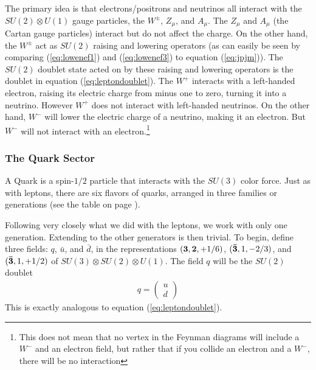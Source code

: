 \documentclass[12pt,epsf]{article}
\begin{document}
The primary idea is that electrons/positrons and neutrinos all interact
with the $SU(2)\otimes U(1)$ gauge particles, the $W^{\pm}$, $Z_{\mu}$,
and $A_{\mu}$.	The $Z_{\mu}$ and $A_{\mu}$ (the Cartan gauge
particles) interact but do not affect the charge.  On the other hand,
the $W^{\pm}$ act as $SU(2)$ raising and lowering operators (as can
easily be seen by comparing (\ref{eq:lowenef1}) and (\ref{eq:lowenef3})
to equation (\ref{eq:jpjm})).  The $SU(2)$ doublet state acted on by these raising
and lowering operators is the doublet in equation
(\ref{eq:leptondoublet}).  The $W^+$ interacts with a left-handed electron,
raising its electric charge from minus one to zero, turning it into a
neutrino.  However $W^+$ does not interact with left-handed neutrinos. 
On the other hand, $W^-$ will lower the electric charge of a neutrino,
making it an electron.	But $W^-$ will not interact with an electron.\footnote{This
does not mean that no vertex in the Feynman diagrams will include a $W^-$ and an 
electron field, but rather that if you collide an electron and a $W^-$, there will be no
interaction}

\subsubsection{The Quark Sector}

A Quark is a spin-$1/2$ particle that interacts with the $SU(3)$ color
force.	Just as with leptons, there are six flavors of quarks, arranged
in three families or generations (see the table on page
\pageref{standardmodelsummary}).  

Following very closely what we did with the leptons, we work with only
one generation.  Extending to the other generators is then trivial.  To
begin, define three fields: $q$, $\bar u$, and $\bar d$, in the
representations $(\bf 3\rm, \bf 2\rm, +1/6)$, $(\bf \bar 3\rm,1,-2/3)$,
and $(\bf \bar 3\rm, 1,+1/2)$ of $SU(3)\otimes SU(2)\otimes U(1)$.  The
field $q$ will be the $SU(2)$ doublet
\begin{eqnarray}
q = \begin{pmatrix} u \\ d \end{pmatrix} \label{eq:quarkdoublet}
\end{eqnarray}
This is exactly analogous to equation (\ref{eq:leptondoublet}).
\end{document}
